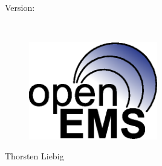 \begin{center}
	~\\
	\vfill
	\begin{Huge}
	\textbf{\displaytitle}\\[2cm]
	\end{Huge}
	\begin{LARGE}
	Version: \echoversion\\[1ex]
	\end{LARGE}
	\begin{large}
	\echodate \\
	\end{large}
	\vfill
	\begin{figure}[h!]
	  \centering
	 \includegraphics[width=0.5\textwidth]{svg/openEMS_logo.eps}\\[1cm]
	\end{figure}
	\begin{LARGE}
	Thorsten Liebig
	\end{LARGE}
	\vfill
\end{center}
